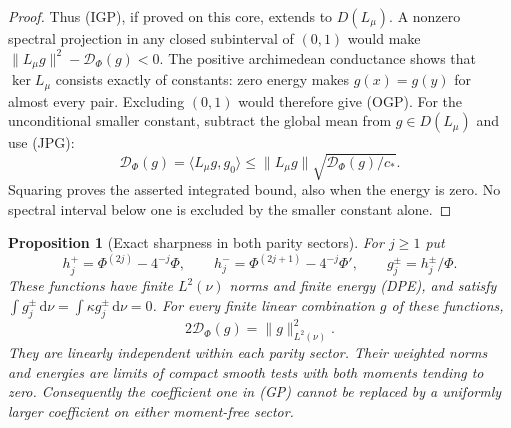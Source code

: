 \documentclass[11pt]{article}
\newtheorem{proposition}[theorem]{Proposition}
\theoremstyle{remark}\newtheorem{remark}[theorem]{Remark}
\newcommand{\dd}{\,\mathrm d}
\begin{document}
\begin{proof}
Thus (IGP), if proved on this core, extends to $D(L_\mu)$.
A nonzero spectral projection in any closed subinterval of
$(0,1)$ would make $\|L_\mu g\|^2-\mathcal D_\Phi(g)<0$.
The positive archimedean conductance shows that
$\ker L_\mu$ consists exactly of constants: zero energy makes
$g(x)=g(y)$ for almost every pair. Excluding $(0,1)$ would
therefore give (OGP). For the unconditional smaller constant,
subtract the global mean from $g\in D(L_\mu)$ and use (JPG):
\[
 \mathcal D_\Phi(g)=\langle L_\mu g,g_0\rangle
       \le\|L_\mu g\|\sqrt{\mathcal D_\Phi(g)/c_*}.
\]
Squaring proves the asserted integrated bound, also when the
energy is zero. No spectral interval below one is excluded by
the smaller constant alone.
\end{proof}

\begin{proposition}[Exact sharpness in both parity sectors]
\label{prop:theta-saturators}
For $j\ge1$ put
\[
 h_j^+=\Phi^{(2j)}-4^{-j}\Phi,\qquad
 h_j^-=\Phi^{(2j+1)}-4^{-j}\Phi',\qquad
 g_j^\pm=h_j^\pm/\Phi .
\]
These functions have finite $L^2(\nu)$ norms and finite energy
(DPE), and satisfy
$\int g_j^\pm\dd\nu=\int\kappa g_j^\pm\dd\nu=0$.
For every finite linear combination $g$ of these functions,
\[
             2\mathcal D_\Phi(g)=\|g\|_{L^2(\nu)}^2.       \tag{SAT}
\]
They are linearly independent within each parity sector.
Their weighted norms and energies are limits of compact smooth
tests with both moments tending to zero.
Consequently the coefficient one in (GP) cannot be replaced
by a uniformly larger coefficient on either moment-free sector.
\end{proposition}
\end{document}
